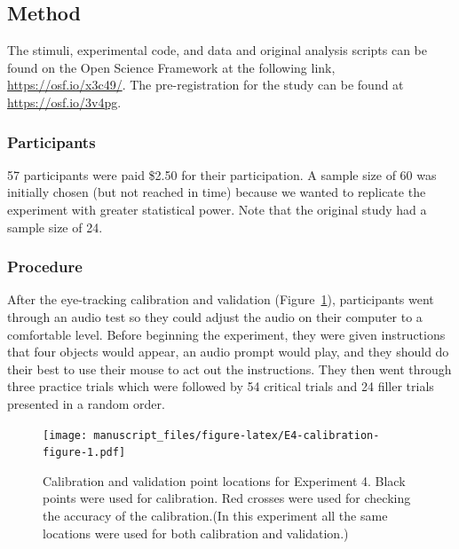 \documentclass[
  man,floatsintext]{apa6}
\begin{document}
\subsection{Method}\label{method-3}

The stimuli, experimental code, and data and original analysis scripts can be
found on the Open Science Framework at the following link,
\url{https://osf.io/x3c49/}. The pre-registration
for the study can be found at \url{https://osf.io/3v4pg}.

\subsubsection{Participants}\label{participants-4}

57 participants were paid \$2.50 for their participation. A sample size of 60 was initially chosen (but not reached in time) because we wanted to replicate the experiment with greater statistical power. Note that the original study had a sample size of 24.

\subsubsection{Procedure}\label{procedure-3}

After the eye-tracking calibration and validation (Figure~\ref{fig:E4-calibration-figure}), participants went through an audio
test so they could adjust the audio on their computer to a comfortable
level. Before beginning the experiment, they were given instructions
that four objects would appear, an audio prompt would play, and they
should do their best to use their mouse to act out the instructions.
They then went through three practice trials which were followed by 54
critical trials and 24 filler trials presented in a random order.

\begin{figure}
\centering
\texttt{[image: manuscript\_files/figure-latex/E4-calibration-figure-1.pdf]}
\caption{\label{fig:E4-calibration-figure}Calibration and validation point locations for Experiment 4. Black points were used for calibration. Red crosses were used for checking the accuracy of the calibration.(In this experiment all the same locations were used for both calibration and validation.)}
\end{figure}
\end{document}
